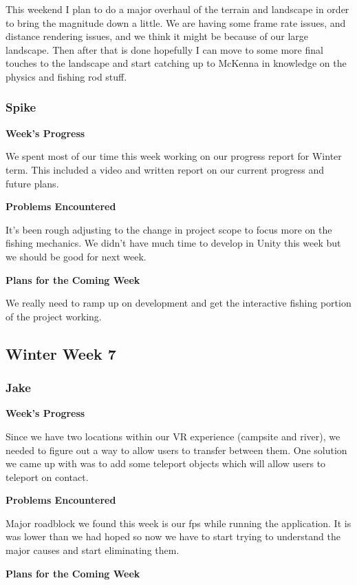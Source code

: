 \documentclass[10pt,journal,compsoc,onecolumn, draftclsnofoot]{IEEEtran}
\begin{document}
This weekend I plan to do a major overhaul of the terrain and landscape in order to bring the magnitude down a little.  We are having some frame rate issues, and distance rendering issues, and we think it might be because of our large landscape. Then after that is done hopefully I can move to some more final touches to the landscape and start catching up to McKenna in knowledge on the physics and fishing rod stuff.

\subsubsection{Spike}
\noindent \textbf{Week's Progress}

We spent most of our time this week working on our progress report for Winter term. This included a video and written report on our current progress and future plans.

\noindent \textbf{Problems Encountered}

It's been rough adjusting to the change in project scope to focus more on the fishing mechanics. We didn't have much time to develop in Unity this week but we should be good for next week.

\noindent \textbf{Plans for the Coming Week}

We really need to ramp up on development and get the interactive fishing portion of the project working.

\subsection{Winter Week 7}
\subsubsection{Jake}
\noindent \textbf{Week's Progress}

Since we have two locations within our VR experience (campsite and river), we needed to figure out a way to allow users to transfer between them. One solution we came up with was to add some teleport objects which will allow users to teleport on contact.

\noindent \textbf{Problems Encountered}

Major roadblock we found this week is our fps while running the application. It is was lower than we had hoped so now we have to start trying to understand the major causes and start eliminating them.

\noindent \textbf{Plans for the Coming Week}
\end{document}
